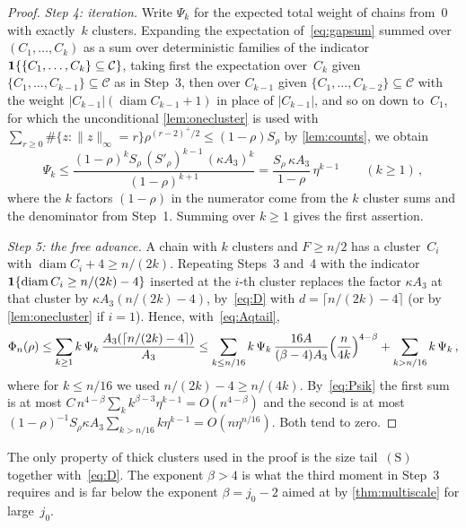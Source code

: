 \documentclass[11pt,letterpaper]{article}
\DeclareMathOperator{\diam}{diam}
\begin{document}
\begin{proof}
\emph{Step 4: iteration.} Write $\Psi_k$ for the expected total weight of chains from~$0$ with exactly~$k$ clusters. Expanding the expectation of~\eqref{eq:gapsum} summed over $(C_1,\dots,C_k)$ as a sum over deterministic families of the indicator $\mathbf{1}\{\{C_1,\dots,C_k\}\subseteq\mathcal C\}$, taking first the expectation over~$C_k$ given $\{C_1,\dots,C_{k-1}\}\subseteq\mathcal C$ as in Step~3, then over $C_{k-1}$ given $\{C_1,\dots,C_{k-2}\}\subseteq\mathcal C$ with the weight $\lvert C_{k-1}\rvert(\diam C_{k-1}+1)$ in place of $\lvert C_{k-1}\rvert$, and so on down to~$C_1$, for which the unconditional \cref{lem:onecluster} is used with $\sum_{r\ge0}\#\{z\colon\lVert z\rVert_\infty=r\}\rho^{(r-2)^+/2}\le(1-\rho)S_\rho$ by \cref{lem:counts}, we obtain
\begin{equation}
\label{eq:Psik}
  \Psi_k\le\frac{(1-\rho)^{k}S_\rho\,(S'_\rho)^{k-1}\,(\kappa A_3)^{k}}{(1-\rho)^{k+1}}=\frac{S_\rho\,\kappa A_3}{1-\rho}\,\eta^{k-1}\qquad(k\ge1)\,,
\end{equation}
where the $k$ factors $(1-\rho)$ in the numerator come from the $k$ cluster sums and the denominator from Step~1. Summing over $k\ge1$ gives the first assertion.

\emph{Step 5: the free advance.} A chain with $k$ clusters and $F\ge n/2$ has a cluster~$C_i$ with $\diam C_i+4\ge n/(2k)$. Repeating Steps~3 and~4 with the indicator $\1\{\diam C_i\ge n/(2k)-4\}$ inserted at the $i$-th cluster replaces the factor $\kappa A_3$ at that cluster by $\kappa A_3(n/(2k)-4)$, by~\eqref{eq:D} with $d=\lceil n/(2k)-4\rceil$ (or by \cref{lem:onecluster} if $i=1$). Hence, with~\eqref{eq:Aqtail},
\begin{equation*}
  \Phi_n(\rho)\le\sum_{k\ge1}k\,\Psi_k\,\frac{A_3(\lceil n/(2k)-4\rceil)}{A_3}\le\sum_{k\le n/16}k\,\Psi_k\,\frac{16A}{(\beta-4)A_3}\Bigl(\frac{n}{4k}\Bigr)^{4-\beta}+\sum_{k>n/16}k\,\Psi_k\,,
\end{equation*}
where for $k\le n/16$ we used $n/(2k)-4\ge n/(4k)$. By~\eqref{eq:Psik} the first sum is at most $C\,n^{4-\beta}\sum_kk^{\beta-3}\eta^{k-1}=O(n^{4-\beta})$ and the second is at most $(1-\rho)^{-1}S_\rho\kappa A_3\sum_{k>n/16}k\eta^{k-1}=O(n\eta^{n/16})$. Both tend to zero.
\end{proof}

\begin{remark}
The only property of thick clusters used in the proof is the size tail~$\mathrm{(S)}$ together with~\eqref{eq:D}. The exponent $\beta>4$ is what the third moment in Step~3 requires and is far below the exponent $\beta=j_0-2$ aimed at by \cref{thm:multiscale} for large~$j_0$.
\end{remark}
\end{document}
